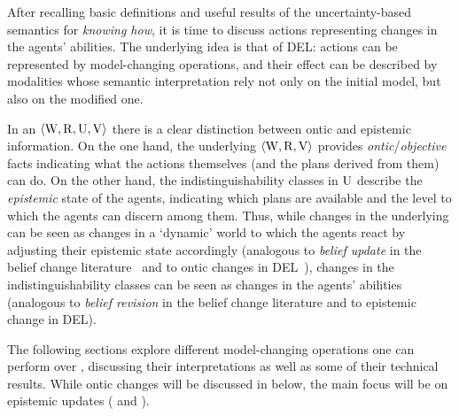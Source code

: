 \medskip

After recalling basic definitions and useful results of the uncertainty-based semantics for \emph{knowing how}, it is time to discuss actions representing changes in the agents' abilities. The underlying idea is that of DEL: actions can be represented by model-changing operations, and their effect can be described by modalities whose semantic interpretation rely not only on the initial model, but also on the modified one. 

In an \ults $\langle \operatorname{W},\operatorname{R},\operatorname{U},\operatorname{V} \rangle$ there is a clear distinction between ontic and epistemic information. On the one hand, the underlying \lts $\langle \operatorname{W},\operatorname{R},\operatorname{V} \rangle$ provides \emph{ontic}/\emph{objective} facts indicating what the actions themselves (and the plans derived from them) can do. On the other hand, the indistinguishability classes in $\operatorname{U}$ describe the \emph{epistemic} state of the agents, indicating which plans are available and the level to which the agents can discern among them. Thus, while changes in the underlying \lts can be seen as changes in a `dynamic' world to which the agents react by adjusting their epistemic state accordingly (analogous to  \emph{belief update} in the belief change literature~\cite{sep-logic-belief-revision} and to ontic changes in DEL~\cite{vanDitmarschKooi2008}), changes in the indistinguishability classes can be seen as changes in the agents' abilities (analogous to \emph{belief revision} in the belief change literature and to epistemic change in DEL).

The following sections explore different model-changing operations one can perform over \ultss, discussing their interpretations as well as some of their technical results. While ontic changes will be discussed in  below, the main focus will be on epistemic updates ( and ).





